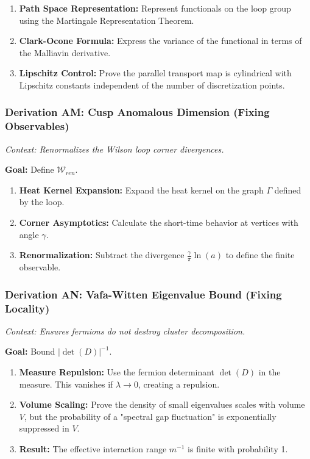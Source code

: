 \begin{enumerate}
    \item \textbf{Path Space Representation:} Represent functionals on the loop group using the Martingale Representation Theorem.
    \item \textbf{Clark-Ocone Formula:} Express the variance of the functional in terms of the Malliavin derivative.
    \item \textbf{Lipschitz Control:} Prove the parallel transport map is cylindrical with Lipschitz constants independent of the number of discretization points.
\end{enumerate}

\subsubsection{Derivation AM: Cusp Anomalous Dimension (Fixing Observables)}

\textit{Context: Renormalizes the Wilson loop corner divergences.}

\textbf{Goal:} Define $\mathcal{W}_{ren}$.

\begin{enumerate}
    \item \textbf{Heat Kernel Expansion:} Expand the heat kernel on the graph $\Gamma$ defined by the loop.
    \item \textbf{Corner Asymptotics:} Calculate the short-time behavior at vertices with angle $\gamma$.
    \item \textbf{Renormalization:} Subtract the divergence $\frac{\gamma}{\pi} \ln(a)$ to define the finite observable.
\end{enumerate}

\subsubsection{Derivation AN: Vafa-Witten Eigenvalue Bound (Fixing Locality)}

\textit{Context: Ensures fermions do not destroy cluster decomposition.}

\textbf{Goal:} Bound $|\det(D)|^{-1}$.

\begin{enumerate}
    \item \textbf{Measure Repulsion:} Use the fermion determinant $\det(D)$ in the measure. This vanishes if $\lambda \to 0$, creating a repulsion.
    \item \textbf{Volume Scaling:} Prove the density of small eigenvalues scales with volume $V$, but the probability of a "spectral gap fluctuation" is exponentially suppressed in $V$.
    \item \textbf{Result:} The effective interaction range $m^{-1}$ is finite with probability 1.
\end{enumerate}

